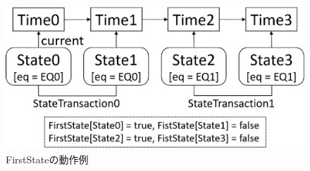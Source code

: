 \documentclass[12pt,a4paper]{jbook}
\begin{document}
\begin{figure}[htb]
\centering
\includegraphics[width=400pt]{./fig/FirstState.eps}
\caption{FirstStateの動作例}
\label{fig:FirstState}
\end{figure}
\end{document}
